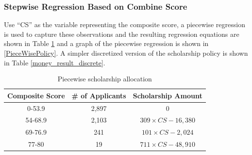 \documentclass[12pt,english]{report}
\begin{document}

%


\subsubsection{Stepwise Regression Based on Combine Score}
Use ``CS'' as the variable representing the composite score, a piecewise regression is used to capture these observations and the resulting regression equations are shown in Table \ref{money_result} and a graph of the piecewise regression is shown in \ref{PieceWisePolicy}. A simpler discretized version of the scholarship policy is shown in Table \ref{money_result_discrete}. 

\begin{table}[H]
\centering
\begin{tabular}{|c|c|c|}
\hline
Composite Score & \# of Applicants & Scholarship Amount \\ \hline
0-53.9         & 2,897  &0              \\ \hline
54-68.9        & 2,103  &$309\times CS -16,380 $            \\ \hline
69-76.9        &  241 &  $101\times CS - 2,024$           \\ \hline
77-80       & 19 &   $711 \times CS -48,910$          \\ \hline
\end{tabular}
\caption{Piecewise scholarship allocation}
\label{money_result}
\end{table}
\end{document}
